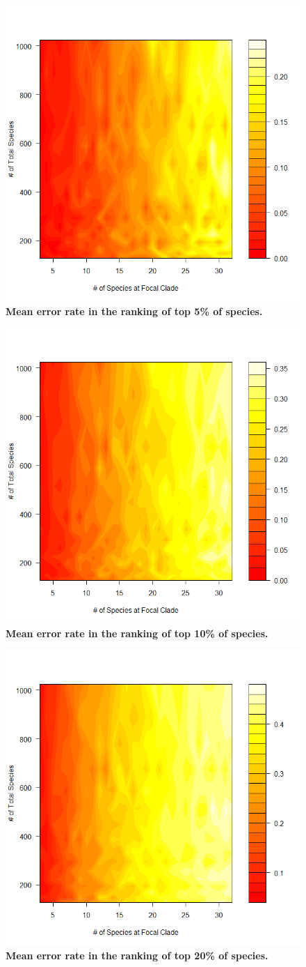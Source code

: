 \documentclass[12pt,english]{article}
\begin{document}
\begin{figure}[!ht]
  \center
  \includegraphics[width=.5\textwidth]{errorRate5pct.png}
  \caption{\textbf{Mean error rate in the ranking of top 5\% of species.} }
\end{figure}

\begin{figure}[!ht]
  \center
  \includegraphics[width=.5\textwidth]{errorRate10pct.png}
  \caption{\textbf{Mean error rate in the ranking of top 10\% of species.} }
\end{figure}

\begin{figure}[!ht]
  \center
  \includegraphics[width=.5\textwidth]{errorRate20pct.png}
  \caption{\textbf{Mean error rate in the ranking of top 20\% of species.}}
\end{figure}
\end{document}
